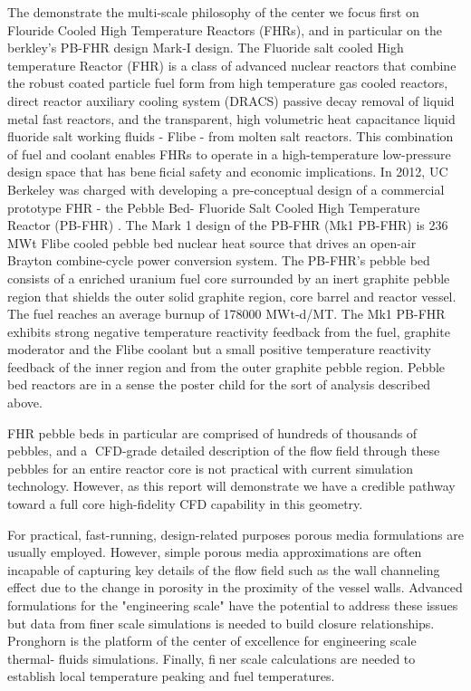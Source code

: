The demonstrate the multi-scale philosophy of the center we focusfirst on Flouride Cooled High Temperature Reactors (FHRs), and in particular on the berkley's PB-FHR design Mark-I design. The Fluoride salt cooled High temperature Reactor (FHR) is a class of advanced nuclear reactors that combine the robust coated particle fuel form from high temperature gas cooled reactors, direct reactor auxiliary cooling system (DRACS) passive decay removal of liquid metal fast reactors, and the transparent, high volumetric heat capacitance liquid fluoride salt working fluids - Flibe - from molten salt reactors. This combination of fuel and coolant enables FHRs to operate in a high-temperature low-pressure design space that has beneficial safety and economic implications. In 2012, UC Berkeley was charged with developing a pre-conceptual design of a commercial prototype FHR - the Pebble Bed- Fluoride Salt Cooled High Temperature Reactor (PB-FHR) \cite{cisneros2014technical}. The Mark 1 design of the PB-FHR (Mk1 PB-FHR) is 236 MWt Flibe cooled pebble bed nuclear heat source that drives an open-air Brayton combine-cycle power conversion system. The PB-FHR's pebble bed consists of a enriched uranium fuel core surrounded by an inert graphite pebble region that shields the outer solid graphite region, core barrel and reactor vessel. The fuel reaches an average burnup of 178000 MWt-d/MT. The Mk1 PB-FHR exhibits strong negative temperature reactivity feedback from the fuel, graphite moderator and the Flibe coolant but a small positive temperature reactivity feedback of the inner region and from the outer graphite pebble region. Pebble bed reactors are in a sense the poster child for the sort of analysis described above.

FHR pebble beds in particular are comprised of hundreds of thousands of pebbles, and a CFD-grade detailed
description of the flowfield through these pebbles for an entire reactor core is not practical with current
simulation technology. However, as this report will demonstrate we have a credible pathway toward a full core high-fidelity CFD capability in this geometry.

For practical, fast-running, design-related purposes porous media formulations are usually employed. However, simple porous media approximations are often incapable of capturing key
details of the flow field such as the wall channeling effect due to the change in porosity in the proximity of the vessel walls.  Advanced formulations for the "engineering scale" have the potential to address these issues but data from finer scale simulations is needed to build closure relationships. Pronghorn is the platform of the center of excellence for engineering scale thermal-
fluids simulations. Finally, finer scale calculations are needed to establish local temperature peaking and fuel temperatures.

